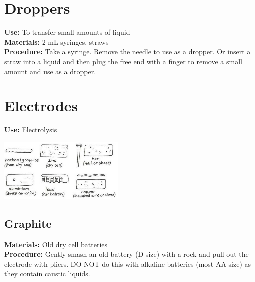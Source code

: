 \begin{multicols}{2}

\section{Droppers}
\label{sec:droppers}
\vspace{-10pt}
\textbf{Use:} To transfer small amounts of liquid \\
\textbf{Materials:} 2 mL syringes, straws\\
\textbf{Procedure:} Take a syringe. Remove the needle to use as a dropper. Or insert a straw into a liquid and then plug the free end with a finger to remove a small amount and use as a dropper.

\section{Electrodes}
\label{sec:electrodes}
\vspace{-10pt}
\textbf{Use:} Electrolysis
\begin{center}
\includegraphics[width=0.45\textwidth]{./img/vso/electrodes.jpg}
\end{center}

\subsection{Graphite}
\vspace{-6pt}
\textbf{Materials:} Old dry cell batteries\\
\textbf{Procedure:} Gently smash an old battery (D size) with a rock and pull out the electrode with pliers. DO NOT do this with alkaline batteries (most AA size) as they contain caustic liquids.

\end{multicols}
